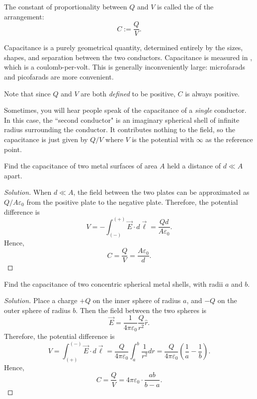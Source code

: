 \begin{definition}
The constant of proportionality between $Q$ and $V$ is called the  of the arrangement:
\[C:=\frac{Q}{V}.\]
\end{definition}

Capacitance is a purely geometrical quantity, determined entirely by the sizes, shapes, and separation between the two conductors. Capacitance is measured in , which is a coulomb-per-volt. This is generally inconveniently large: microfarads and picofarads are more convenient.

Note that since $Q$ and $V$ are both \textit{defined} to be positive, $C$ is always positive. 

\begin{remark}
Sometimes, you will hear people speak of the capacitance of a \textit{single} conductor. In this case, the ``second conductor" is an imaginary spherical shell of infinite radius surrounding the conductor. It contributes nothing to the field, so the capacitance is just given by $Q/V$ where $V$ is the potential with $\infty$ as the reference point.
\end{remark}

\begin{example}
Find the capacitance of two metal surfaces of area $A$ held a distance of $d\ll A$ apart.
\end{example}

\begin{proof}[Solution]
When $d\ll A$, the field between the two plates can be approximated as $Q/A\varepsilon_0$ from the positive plate to the negative plate. Therefore, the potential difference is
\[V=-\int_{(-)}^{(+)}\vec{E}\cdot d\vec{\ell}=\frac{Qd}{A\varepsilon_0}.\]
Hence,
\[C=\frac{Q}{V}=\boxed{\frac{A\varepsilon_0}{d}}.\]
\end{proof}

\begin{example}
Find the capacitance of two concentric spherical metal shells, with radii $a$ and $b$.
\end{example}

\begin{proof}[Solution]
Place a charge $+Q$ on the inner sphere of radius $a$, and $-Q$ on the outer sphere of radius $b$. Then the field between the two spheres is
\[\vec{E}=\frac{1}{4\pi\varepsilon_0}\frac{Q}{r^2}\hat{r}.\]
Therefore, the potential difference is
\[V=\int_{(+)}^{(-)}\vec{E}\cdot d\vec{\ell}=\frac{Q}{4\pi\varepsilon_0}\int_a^b\frac{1}{r^2}dr=\frac{Q}{4\pi\varepsilon_0}\left(\frac{1}{a}-\frac{1}{b}\right).\]
Hence,
\[C=\frac{Q}{V}=\boxed{4\pi\varepsilon_0\cdot\frac{ab}{b-a}}.\]
\end{proof}

